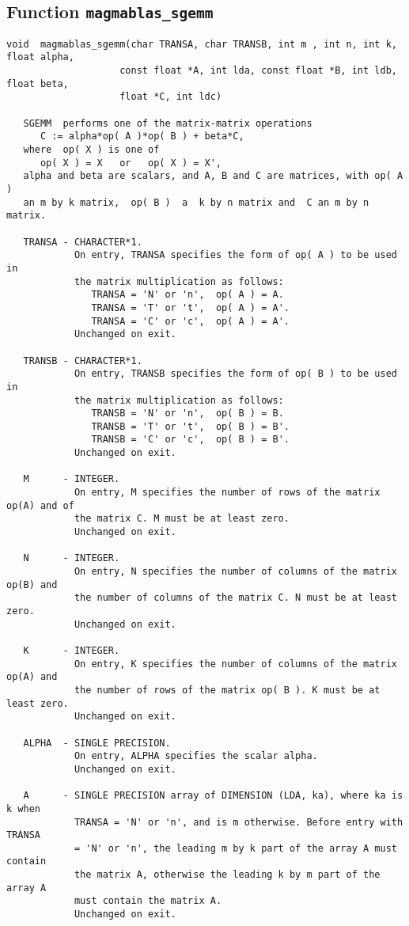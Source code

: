 \documentclass[10pt]{book}
\begin{document}
\subsection{Function {\tt {\bf magmablas\_sgemm}}}
\begin{verbatim}
void  magmablas_sgemm(char TRANSA, char TRANSB, int m , int n, int k, float alpha,
                    const float *A, int lda, const float *B, int ldb, float beta,
                    float *C, int ldc)

   SGEMM  performs one of the matrix-matrix operations
      C := alpha*op( A )*op( B ) + beta*C,
   where  op( X ) is one of
      op( X ) = X   or   op( X ) = X',
   alpha and beta are scalars, and A, B and C are matrices, with op( A )
   an m by k matrix,  op( B )  a  k by n matrix and  C an m by n matrix.
 
   TRANSA - CHARACTER*1.
            On entry, TRANSA specifies the form of op( A ) to be used in
            the matrix multiplication as follows:
               TRANSA = 'N' or 'n',  op( A ) = A.
               TRANSA = 'T' or 't',  op( A ) = A'.
               TRANSA = 'C' or 'c',  op( A ) = A'.
            Unchanged on exit.
 
   TRANSB - CHARACTER*1.
            On entry, TRANSB specifies the form of op( B ) to be used in
            the matrix multiplication as follows:
               TRANSB = 'N' or 'n',  op( B ) = B.
               TRANSB = 'T' or 't',  op( B ) = B'.
               TRANSB = 'C' or 'c',  op( B ) = B'.
            Unchanged on exit.
 
   M      - INTEGER.
            On entry, M specifies the number of rows of the matrix op(A) and of
            the matrix C. M must be at least zero.
            Unchanged on exit.
 
   N      - INTEGER.
            On entry, N specifies the number of columns of the matrix op(B) and
            the number of columns of the matrix C. N must be at least zero.
            Unchanged on exit.
 
   K      - INTEGER.
            On entry, K specifies the number of columns of the matrix op(A) and
            the number of rows of the matrix op( B ). K must be at least zero.
            Unchanged on exit.
 
   ALPHA  - SINGLE PRECISION.
            On entry, ALPHA specifies the scalar alpha.
            Unchanged on exit.
 
   A      - SINGLE PRECISION array of DIMENSION (LDA, ka), where ka is k when
            TRANSA = 'N' or 'n', and is m otherwise. Before entry with TRANSA 
            = 'N' or 'n', the leading m by k part of the array A must contain 
            the matrix A, otherwise the leading k by m part of the array A  
            must contain the matrix A.
            Unchanged on exit.
 

\end{verbatim}
\end{document}
